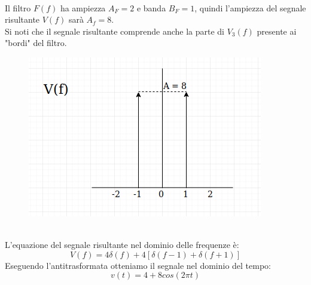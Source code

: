 \documentclass[12pt,a4paper]{article}
\begin{document}
	\\Il filtro $F(f)$ ha ampiezza $A_F=2$ e banda $B_F=1$, quindi l'ampiezza del segnale risultante $V(f)$ sar\`a $A_f = 8$.\\Si noti che il segnale risultante comprende anche la parte di $V_3(f)$ presente ai "bordi" del filtro.
	\begin{figure}[h!]
		\centering
		\includegraphics[scale=0.4]{./images/fourier58.png}
	\end{figure}
	\\L'equazione del segnale risultante nel dominio delle frequenze è:
	\[
		V(f) = 4\delta(f) + 4[\delta(f-1) + \delta(f+1)]
	\]
	Eseguendo l'antitrasformata otteniamo il segnale nel dominio del tempo:
	\[
		v(t) =  4 + 8cos(2\pi t)
	\]
	\newpage
\end{document}

